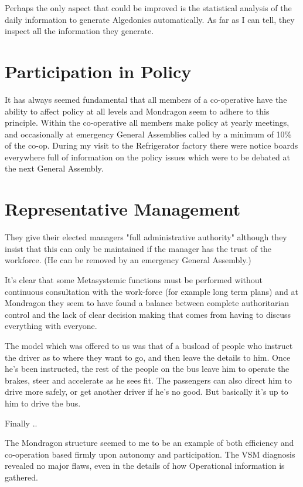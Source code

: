 Perhaps the only aspect that could be improved is the statistical analysis of the daily information to generate Algedonics automatically. As far as I can tell, they inspect all the information they generate.

\section*{Participation in Policy}
It has always seemed fundamental that all members of a co-operative have the ability to affect policy at all levels and Mondragon seem to adhere to this principle. Within the co-operative all members make policy at yearly meetings, and occasionally at emergency General Assemblies called by a minimum of 10\% of the co-op. During my visit to the Refrigerator factory there were notice boards everywhere full of information on the policy issues which were to be debated at the next General Assembly.

\section*{Representative Management}
They give their elected managers "full administrative authority" although they insist that this can only be maintained if the manager has the trust of the workforce. (He can be removed by an emergency General Assembly.)

It's clear that some Metasystemic functions must be performed without continuous consultation with the work-force (for example long term plans) and at Mondragon they seem to have found a balance between complete authoritarian control and the lack of clear decision making that comes from having to discuss everything with everyone.

The model which was offered to us was that of a busload of people who instruct the driver as to where they want to go, and then leave the details to him. Once he's been instructed, the rest of the people on the bus leave him to operate the brakes, steer and accelerate as he sees fit. The passengers can also direct him to drive more safely, or get another driver if he's no good. But basically it's up to him to drive the bus.

Finally ..

The Mondragon structure seemed to me to be an example of both efficiency and co-operation based firmly upon autonomy and participation. The VSM diagnosis revealed no major flaws, even in the details of how Operational information is gathered.